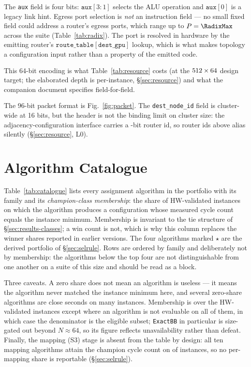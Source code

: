 \documentclass[journal,10pt]{IEEEtran}
\theoremstyle{plain}
\theoremstyle{definition}
\theoremstyle{remark}
\newcommand{\sv}[1]{\texttt{#1}}
\begin{document}
The \sv{aux} field is four bits: $\sv{aux}[3{:}1]$ selects the ALU operation
and $\sv{aux}[0]$ is a legacy link hint. Egress port selection is \emph{not}
an instruction field --- no small fixed field could address a router's egress
ports, which range up to $P = \RadixMax$ across the suite
(Table~\ref{tab:radix}). The port is resolved in hardware by the emitting
router's $\texttt{route\_table}[\sv{dest\_gpu}]$ lookup, which is what makes
topology a configuration input rather than a property of the emitted code.

This 64-bit encoding is what Table~\ref{tab:resource} costs (at the
$512 \times 64$ design target; the elaborated depth is per-instance,
\S\ref{sec:resource}) and what the companion document specifies
field-for-field.

The 96-bit packet format is Fig.~\ref{fig:packet}. The
\sv{dest\_node\_id} field is cluster-wide at 16 bits, but the header is not
the binding limit on cluster size: the adjacency-configuration interface
carries a \RouterIdBits-bit router id, so router ids above \RouterIdMax{}
alias silently (\S\ref{sec:resource}, L0).

\section{Algorithm Catalogue}\label{app:algos}

Table~\ref{tab:catalogue} lists every assignment algorithm in the portfolio
with its family and its \emph{champion-class membership}: the share of
HW-validated instances on which the algorithm produces a configuration whose
measured cycle count equals the instance minimum. Membership is invariant to
the tie structure of \S\ref{sec:results-classes}; a win count is not, which
is why this column replaces the winner shares reported in earlier versions.
The four algorithms marked $\star$ are the derived portfolio of
\S\ref{sec:selrule}. Rows are ordered by family and deliberately not by
membership: the algorithms below the top four are not distinguishable from
one another on a suite of this size and should be read as a block.

Three caveats. A zero share does not mean an algorithm is useless --- it
means the algorithm never matched the instance minimum here, and several
zero-share algorithms are close seconds on many instances. Membership is over
the \TournNInst{} HW-validated instances except where an algorithm is not
evaluable on all of them, in which case the denominator is the eligible
subset; \sv{ExactBB} in particular is size-gated out beyond $N \approx 64$,
so its figure reflects unavailability rather than defeat. Finally, the
mapping (S3) stage is absent from the table by design: all ten mapping
algorithms attain the champion cycle count on \ClsAllMappings{} of
\TournNInst{} instances, so no per-mapping share is reportable
(\S\ref{sec:selrule}).
\end{document}
